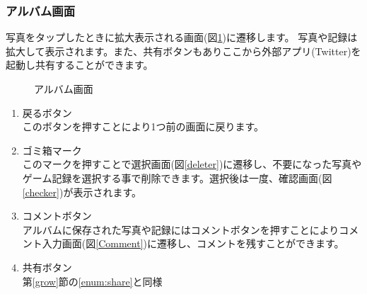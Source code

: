 \documentclass[a4j]{jarticle}
\begin{document}
\newpage
\subsubsection{アルバム画面}
写真をタップしたときに拡大表示される画面(図\ref{Albam})に遷移します。
写真や記録は拡大して表示されます。また、共有ボタンもありここから外部アプリ(Twitter)を起動し共有することができます。

\begin{figure}[H]
    \begin{center}
    \caption {アルバム画面}
    \label{Albam}
    \end{center}
\end{figure}

\begin{enumerate}
  \renewcommand{\labelenumi}{\textcircled{\scriptsize \theenumi}}
  \item 戻るボタン\\
       このボタンを押すことにより1つ前の画面に戻ります。
  \item ゴミ箱マーク\\
      このマークを押すことで選択画面(図\ref{deleter})に遷移し、不要になった写真やゲーム記録を選択する事で削除できます。選択後は一度、確認画面(図\ref{checker})が表示されます。
  \item コメントボタン\\
    アルバムに保存された写真や記録にはコメントボタンを押すことによりコメント入力画面(図\ref{Comment})に遷移し、コメントを残すことができます。
  \item 共有ボタン\\
        第\ref{grow}節の\ref{enum:share}と同様
\end{enumerate}
\end{document}

